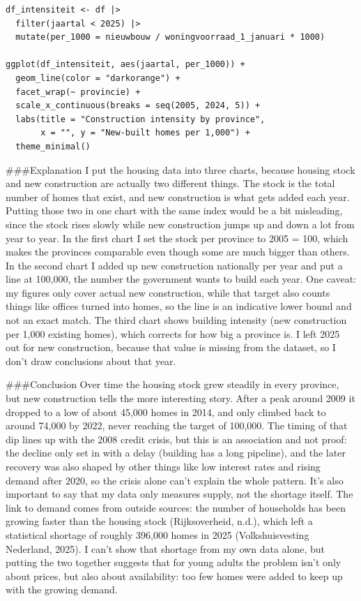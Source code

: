 \documentclass[
]{article}
\begin{document}
\begin{verbatim}
df_intensiteit <- df |> 
  filter(jaartal < 2025) |> 
  mutate(per_1000 = nieuwbouw / woningvoorraad_1_januari * 1000)

ggplot(df_intensiteit, aes(jaartal, per_1000)) +
  geom_line(color = "darkorange") +
  facet_wrap(~ provincie) +
  scale_x_continuous(breaks = seq(2005, 2024, 5)) +
  labs(title = "Construction intensity by province",
       x = "", y = "New-built homes per 1,000") +
  theme_minimal()
\end{verbatim}

\#\#\#Explanation I put the housing data into three charts, because
housing stock and new construction are actually two different things.
The stock is the total number of homes that exist, and new construction
is what gets added each year. Putting those two in one chart with the
same index would be a bit misleading, since the stock rises slowly while
new construction jumps up and down a lot from year to year. In the first
chart I set the stock per province to 2005 = 100, which makes the
provinces comparable even though some are much bigger than others. In
the second chart I added up new construction nationally per year and put
a line at 100,000, the number the government wants to build each year.
One caveat: my figures only cover actual new construction, while that
target also counts things like offices turned into homes, so the line is
an indicative lower bound and not an exact match. The third chart shows
building intensity (new construction per 1,000 existing homes), which
corrects for how big a province is. I left 2025 out for new
construction, because that value is missing from the dataset, so I don't
draw conclusions about that year.

\#\#\#Conclusion Over time the housing stock grew steadily in every
province, but new construction tells the more interesting story. After a
peak around 2009 it dropped to a low of about 45,000 homes in 2014, and
only climbed back to around 74,000 by 2022, never reaching the target of
100,000. The timing of that dip lines up with the 2008 credit crisis,
but this is an association and not proof: the decline only set in with a
delay (building has a long pipeline), and the later recovery was also
shaped by other things like low interest rates and rising demand after
2020, so the crisis alone can't explain the whole pattern. It's also
important to say that my data only measures supply, not the shortage
itself. The link to demand comes from outside sources: the number of
households has been growing faster than the housing stock
(Rijksoverheid, n.d.), which left a statistical shortage of roughly
396,000 homes in 2025 (Volkshuisvesting Nederland, 2025). I can't show
that shortage from my own data alone, but putting the two together
suggests that for young adults the problem isn't only about prices, but
also about availability: too few homes were added to keep up with the
growing demand.
\end{document}
